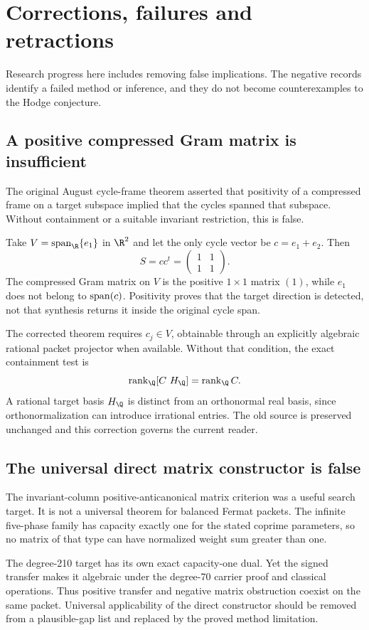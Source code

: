 \chapter{Corrections, failures and retractions}
Research progress here includes removing false implications. The negative records identify a failed method or inference, and they do not become counterexamples to the Hodge conjecture.

\section{A positive compressed Gram matrix is insufficient}
The original August cycle-frame theorem asserted that positivity of a compressed frame on a target subspace implied that the cycles spanned that subspace. Without containment or a suitable invariant restriction, this is false.

Take $V=\Span_{\R}\{e_1\}$ in $\R^2$ and let the only cycle vector be $c=e_1+e_2$. Then
\[
S=cc^t=\begin{pmatrix}1&1\\1&1\end{pmatrix}.
\]
The compressed Gram matrix on $V$ is the positive $1\times1$ matrix $(1)$, while $e_1$ does not belong to $\operatorname{span}(c)$. Positivity proves that the target direction is detected, not that synthesis returns it inside the original cycle span.

The corrected theorem requires $c_j\in V$, obtainable through an explicitly algebraic rational packet projector when available. Without that condition, the exact containment test is
\[
\rank_{\Q}[C\ H_{\Q}]=\rank_{\Q}C.
\]
A rational target basis $H_{\Q}$ is distinct from an orthonormal real basis, since orthonormalization can introduce irrational entries. The old source is preserved unchanged and this correction governs the current reader.

\section{The universal direct matrix constructor is false}
The invariant-column positive-anticanonical matrix criterion was a useful search target. It is not a universal theorem for balanced Fermat packets. The infinite five-phase family has capacity exactly one for the stated coprime parameters, so no matrix of that type can have normalized weight sum greater than one.

The degree-210 target has its own exact capacity-one dual. Yet the signed transfer makes it algebraic under the degree-70 carrier proof and classical operations. Thus positive transfer and negative matrix obstruction coexist on the same packet. Universal applicability of the direct constructor should be removed from a plausible-gap list and replaced by the proved method limitation.

